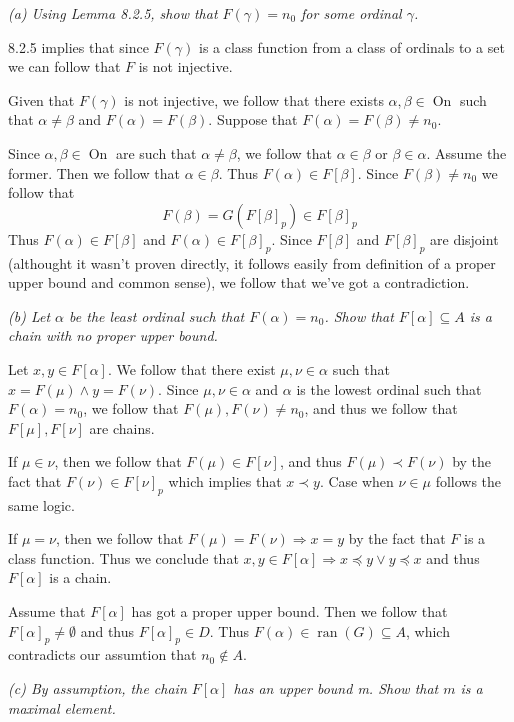 \documentclass[11pt,oneside,titlepage]{book}
\DeclareMathOperator \ra {\Rightarrow}
\DeclareMathOperator \ran {ran}
\DeclareMathOperator \On {On}
\begin{document}
\textit{(a) Using Lemma 8.2.5, show that $F(\gamma) = n_0$ for some ordinal $\gamma$.}

8.2.5 implies that since $F(\gamma)$ is a class function from a class of ordinals to
a set we can follow that $F$ is not injective.

Given that $F(\gamma)$ is not injective, we follow that there exists
$\alpha, \beta \in \On$ such that $\alpha \neq \beta$ and $F(\alpha) = F(\beta)$.
Suppose that $F(\alpha)  = F(\beta) \neq n_0$. 

Since $\alpha, \beta \in \On$ are such that $\alpha \neq \beta$, we follow that
$\alpha \in \beta$ or $\beta \in \alpha$. Assume the former.
Then we follow that $\alpha \in \beta$. Thus $F(\alpha) \in F[\beta]$. Since $F(\beta) \neq n_0$
we follow that 
$$F(\beta) = G(F[\beta]_p) \in F[\beta]_p$$
Thus $F(\alpha) \in F[\beta]$ and $F(\alpha) \in F[\beta]_p$. Since $F[\beta]$ and $F[\beta]_p$
are disjoint (althought it wasn't proven directly, it follows easily from definition
of a proper upper bound and common sense), we follow that we've got a contradiction.

\textit{(b) Let $\alpha$ be the least ordinal such that $F(\alpha) = n_0$. Show that
  $F[\alpha] \subseteq A$ is a chain with no proper upper bound.}

Let $x, y \in F[\alpha]$. We follow that there exist $\mu, \nu \in \alpha$ such that
$x = F(\mu) \land y = F(\nu)$. Since $\mu, \nu \in \alpha$ and $\alpha$
is the lowest ordinal such that $F(\alpha) = n_0$, we follow that
$F(\mu), F(\nu) \neq n_0$, and thus we follow that $F[\mu], F[\nu]$ are chains.

If $\mu \in \nu$, then we follow that $F(\mu) \in F[\nu]$, and thus $F(\mu) \prec F(\nu)$
by the fact that $F(\nu) \in F[\nu]_p$ which implies that $x \prec y$.
Case when $\nu \in \mu$ follows the same logic.

If $\mu = \nu$, then we follow that $F(\mu) = F(\nu) \ra x = y$
by the fact that $F$ is a class function.
Thus we conclude that $x, y \in F[\alpha] \ra x \preceq y \lor y \preceq x$ and thus $F[\alpha]$
is a chain.

Assume that $F[\alpha]$ has got a proper upper bound. Then we follow that
$F[\alpha]_p \neq \emptyset$ and thus $F[\alpha]_p \in D$. Thus
$F(\alpha) \in \ran(G) \subseteq A$, which contradicts our assumtion that $n_0 \notin A$.

\textit{(c) By assumption, the chain $F[\alpha]$ has an upper bound m. Show that $m$
  is a maximal element.}
\end{document}
